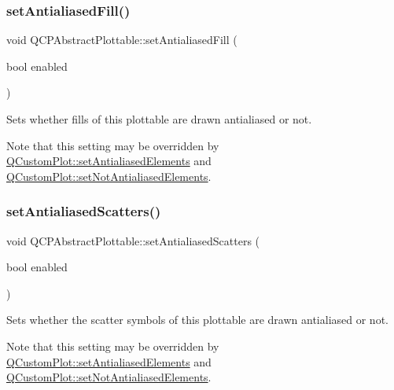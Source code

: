 \subsubsection{\texorpdfstring{set\+Antialiased\+Fill()}{setAntialiasedFill()}}
{\footnotesize\ttfamily void Q\+C\+P\+Abstract\+Plottable\+::set\+Antialiased\+Fill (\begin{DoxyParamCaption}\item[{bool}]{enabled }\end{DoxyParamCaption})}

Sets whether fills of this plottable are drawn antialiased or not.

Note that this setting may be overridden by \mbox{\hyperlink{class_q_custom_plot_af6f91e5eab1be85f67c556e98c3745e8}{Q\+Custom\+Plot\+::set\+Antialiased\+Elements}} and \mbox{\hyperlink{class_q_custom_plot_ae10d685b5eabea2999fb8775ca173c24}{Q\+Custom\+Plot\+::set\+Not\+Antialiased\+Elements}}. \mbox{\label{class_q_c_p_abstract_plottable_a2f03f067ede2ed4da6f7d0e4777a3f02}} 
\subsubsection{\texorpdfstring{set\+Antialiased\+Scatters()}{setAntialiasedScatters()}}
{\footnotesize\ttfamily void Q\+C\+P\+Abstract\+Plottable\+::set\+Antialiased\+Scatters (\begin{DoxyParamCaption}\item[{bool}]{enabled }\end{DoxyParamCaption})}

Sets whether the scatter symbols of this plottable are drawn antialiased or not.

Note that this setting may be overridden by \mbox{\hyperlink{class_q_custom_plot_af6f91e5eab1be85f67c556e98c3745e8}{Q\+Custom\+Plot\+::set\+Antialiased\+Elements}} and \mbox{\hyperlink{class_q_custom_plot_ae10d685b5eabea2999fb8775ca173c24}{Q\+Custom\+Plot\+::set\+Not\+Antialiased\+Elements}}. \mbox{\label{class_q_c_p_abstract_plottable_a7a4b92144dca6453a1f0f210e27edc74}} 
